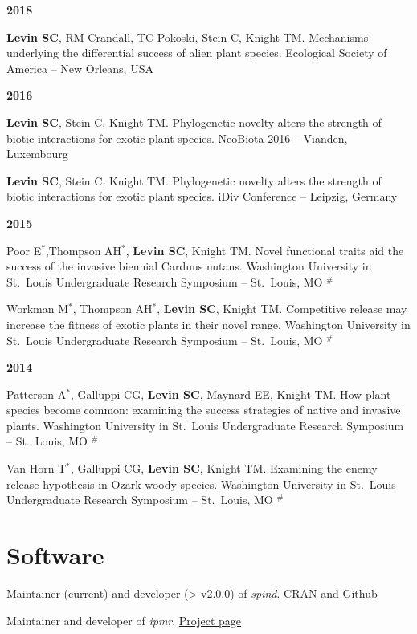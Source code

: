 \documentclass[11pt,]{article}
\begin{document}
\textbf{2018}

\textbf{Levin SC}, RM Crandall, TC Pokoski, Stein C, Knight TM.
Mechanisms underlying the differential success of alien plant species.
Ecological Society of America -- New Orleans, USA

\textbf{2016}

\textbf{Levin SC}, Stein C, Knight TM. Phylogenetic novelty alters the
strength of biotic interactions for exotic plant species. NeoBiota 2016
-- Vianden, Luxembourg

\textbf{Levin SC}, Stein C, Knight TM. Phylogenetic novelty alters the
strength of biotic interactions for exotic plant species. iDiv
Conference -- Leipzig, Germany

\textbf{2015}

Poor E\(^\ast\),Thompson AH\(^\ast\), \textbf{Levin SC}, Knight TM.
Novel functional traits aid the success of the invasive biennial Carduus
nutans. Washington University in St.~Louis Undergraduate Research
Symposium -- St.~Louis, MO \(^\#\)

Workman M\(^\ast\), Thompson AH\(^\ast\), \textbf{Levin SC}, Knight TM.
Competitive release may increase the fitness of exotic plants in their
novel range. Washington University in St.~Louis Undergraduate Research
Symposium -- St.~Louis, MO \(^\#\)

\textbf{2014}

Patterson A\(^\ast\), Galluppi CG, \textbf{Levin SC}, Maynard EE, Knight
TM. How plant species become common: examining the success strategies of
native and invasive plants. Washington University in St.~Louis
Undergraduate Research Symposium -- St.~Louis, MO \(^\#\)

Van Horn T\(^\ast\), Galluppi CG, \textbf{Levin SC}, Knight TM.
Examining the enemy release hypothesis in Ozark woody species.
Washington University in St.~Louis Undergraduate Research Symposium --
St.~Louis, MO \(^\#\)

\hypertarget{software}{%
\section{Software}\label{software}}

Maintainer (current) and developer (\textgreater{} v2.0.0) of
\emph{spind}.
\href{https://cran.r-project.org/web/checks/check_results_spind.html}{CRAN}
and \href{https://github.com/levisc8/spind}{Github}

Maintainer and developer of \emph{ipmr}.
\href{https://levisc8.github.io/ipmr/}{Project page}
\end{document}
